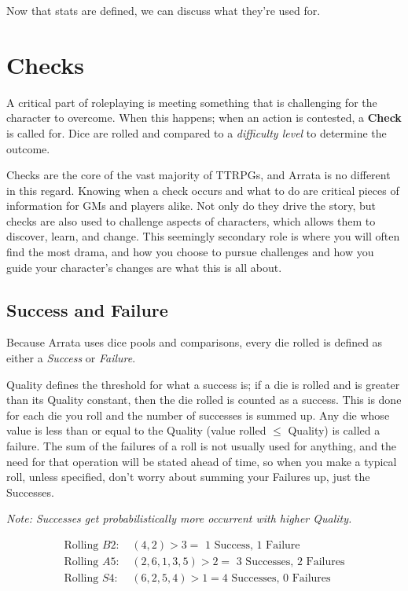 \documentclass[../main.tex]{subfiles}
\begin{document}
    Now that stats are defined, we can discuss what they're used for.

    \section{Checks}

    A critical part of roleplaying is meeting something that is challenging for the character to overcome. When this happens; when an action is contested, a \textbf{Check} is called for. Dice are rolled and compared to a {\em difficulty level} to determine the outcome.

    Checks are the core of the vast majority of TTRPGs, and Arrata is no different in this regard. Knowing when a check occurs and what to do are critical pieces of information for GMs and players alike. Not only do they drive the story, but checks are also used to challenge aspects of characters, which allows them to discover, learn, and change. This seemingly secondary role is where you will often find the most drama, and how you choose to pursue challenges and how you guide your character's changes are what this is all about.

    \subsection{Success and Failure}

    Because Arrata uses dice pools and comparisons, every die rolled is defined as either a \emph{Success} or \emph{Failure}. 
    
    Quality defines the threshold for what a success is; if a die is rolled and is greater than its Quality constant, then the die rolled is counted as a success. This is done for each die you roll and the number of successes is summed up. Any die whose value is less than or equal to the Quality (value rolled $\leq$ Quality) is called a failure. The sum of the failures of a roll is not usually used for anything, and the need for that operation will be stated ahead of time, so when you make a typical roll, unless specified, don't worry about summing your Failures up, just the Successes.
    
    \emph{Note: Successes get probabilistically more occurrent with higher Quality.}
    \\
    \begin{mdframed}[style=Arrata]
        \begin{align*}
            \text{Rolling $B2$: } & (4,2) > 3 = \text{ 1 Success, 1 Failure}                \\
            \text{Rolling $A5$: } & (2, 6, 1, 3, 5) > 2 = \text{ 3 Successes, 2 Failures}   \\
            \text{Rolling $S4$: } & (6, 2, 5, 4) > 1 = \text{4 Successes, 0 Failures}
        \end{align*}
    \end{mdframed}
\end{document}

